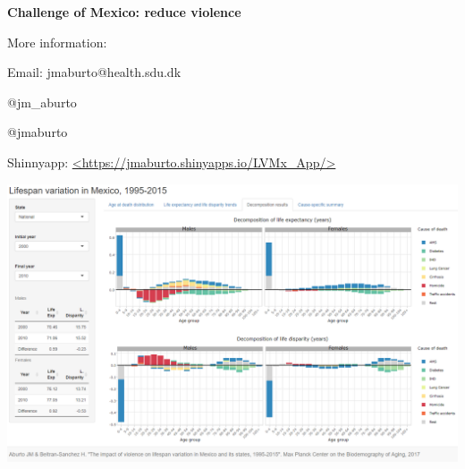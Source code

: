 \documentclass[xcolor={dvipsnames}]{beamer}
\begin{document}
\begin{frame}
 \begin{center}
	\begin{center}
	 \textbf{Challenge of Mexico: reduce violence}
	\end{center}
	
	\bigskip
	\bigskip
More information: 

Email: jmaburto@health.sdu.dk 

\faTwitter \quad  @jm\_aburto 

\faGithub \quad @jmaburto 

Shinnyapp: \url{<https://jmaburto.shinyapps.io/LVMx_App/>}


\includegraphics[scale=0.23]{Figures/Shinnyapp_fig} \\   

 

\end{center}
 
 

\end{frame}
\end{document}
